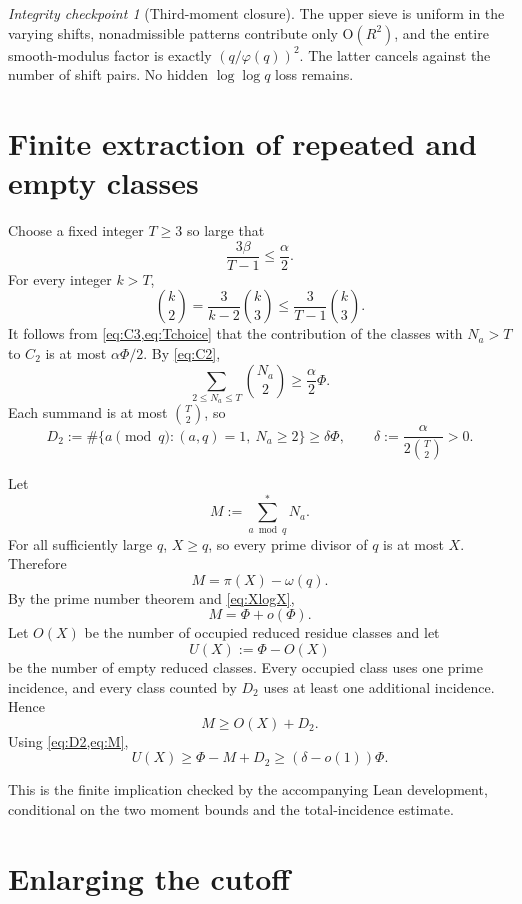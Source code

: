 \documentclass[11pt]{article}
\theoremstyle{definition}
\theoremstyle{remark}
\newtheorem{checkpoint}[theorem]{Integrity checkpoint}
\newcommand{\ph}{\varphi}
\newcommand{\1}{\mathbf 1}
\newcommand{\OO}{\mathrm O}
\newcommand{\om}{\omega}
\begin{document}
\begin{checkpoint}[Third-moment closure]
The upper sieve is uniform in the varying shifts, nonadmissible patterns contribute only $\OO(R^2)$, and the entire smooth-modulus factor is exactly $(q/\ph(q))^2$.  The latter cancels against the number of shift pairs.  No hidden $\log\log q$ loss remains.
\end{checkpoint}

\section{Finite extraction of repeated and empty classes}

Choose a fixed integer $T\ge3$ so large that
\begin{equation}\label{eq:Tchoice}
 \frac{3\beta}{T-1}\le\frac\alpha2.
\end{equation}
For every integer $k>T$,
\[
 \binom{k}{2}=\frac{3}{k-2}\binom{k}{3}
 \le\frac{3}{T-1}\binom{k}{3}.
\]
It follows from \cref{eq:C3,eq:Tchoice} that the contribution of the classes with $N_a>T$ to $C_2$ is at most $\alpha\Phi/2$.  By \cref{eq:C2},
\[
 \sum_{2\le N_a\le T}\binom{N_a}{2}\ge\frac\alpha2\Phi.
\]
Each summand is at most $\binom T2$, so
\begin{equation}\label{eq:D2}
 D_2:=\#\{a\pmod q:(a,q)=1,\ N_a\ge2\}
 \ge\delta\Phi,
 \qquad
 \delta:=\frac{\alpha}{2\binom T2}>0.
\end{equation}

Let
\[
 M:=\sum_{a\bmod q}^{*}N_a.
\]
For all sufficiently large $q$, $X\ge q$, so every prime divisor of $q$ is at most $X$.  Therefore
\[
 M=\pi(X)-\om(q).
\]
By the prime number theorem and \cref{eq:XlogX},
\begin{equation}\label{eq:M}
 M=\Phi+o(\Phi).
\end{equation}
Let $O(X)$ be the number of occupied reduced residue classes and let
\[
 U(X):=\Phi-O(X)
\]
be the number of empty reduced classes.  Every occupied class uses one prime incidence, and every class counted by $D_2$ uses at least one additional incidence.  Hence
\[
 M\ge O(X)+D_2.
\]
Using \cref{eq:D2,eq:M},
\begin{equation}\label{eq:UX}
 U(X)\ge\Phi-M+D_2\ge(\delta-o(1))\Phi.
\end{equation}

This is the finite implication checked by the accompanying Lean development, conditional on the two moment bounds and the total-incidence estimate.

\section{Enlarging the cutoff}
\end{document}
